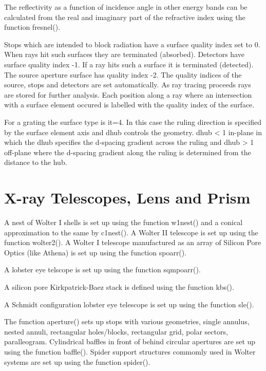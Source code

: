 \documentclass[letterpaper,10pt,english]{sphinxmanual}
\begin{document}
The reflectivity as a function of incidence angle in other energy bands can be
calculated from the real and imaginary part of the refractive index using
the function fresnel().

Stops which are intended to block radiation have a surface quality index
set to 0. When rays hit such surfaces they are terminated (absorbed).
Detectors have surface quality index -1. If a ray hits such a surface
it is terminated (detected).
The source aperture surface has quality index -2.
The quality indices of the source, stops and detectors are set automatically.
As ray tracing proceeds rays are stored for further analysis. Each position
along a ray where an intersection with a surface element occured is
labelled with the quality index of the surface.

For a grating the surface type is it=4.
In this case the ruling direction is specified by
the surface element axis and dhub controls the geometry. dhub \textless{} 1 in-plane
in which the dhub specifies the d-spacing gradient across the ruling
and dhub \textgreater{} 1 off-plane where the d-spacing gradient along the ruling is
determined from the distance to the hub.


\section{X-ray Telescopes, Lens and Prism}
\label{\detokenize{xsrt_telescopes:x-ray-telescopes-lens-and-prism}}\label{\detokenize{xsrt_telescopes::doc}}

A nest of Wolter I shells is set up using the function w1nest() and
a conical approximation to the same by c1nest(). A Wolter II telescope
is set up using the function wolter2().
A Wolter I telescope manufactured as an array of Silicon Pore Optics
(like Athena) is set up using the function spoarr().


A lobster eye telscope is set up using the function sqmpoarr().

A silicon pore Kirkpatrick-Baez stack is defined using the function
kbs().

A Schmidt configuration lobster eye telescope is set up using the
function sle().


The function aperture() sets up stops with various geometries, single
annulus, nested annuli, rectangular holes/blocks, rectangular grid,
polar sectors, paralleogram. Cylindrical baffles in front of behind
circular apertures are set up using the function baffle(). Spider
support structures commomly used in Wolter systems are set up using
the function spider().
\end{document}
